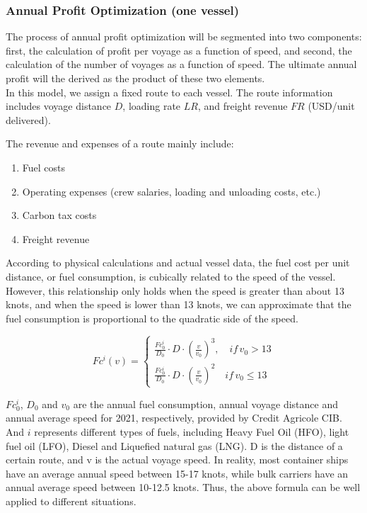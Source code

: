 \documentclass[a4paper,12pt]{article}
\begin{document}
\subsubsection*{Annual Profit Optimization (one vessel)}

The process of annual profit optimization will be segmented into two components: first, the calculation of profit per voyage as a function of speed, and second, the calculation of the number of voyages as a function of speed.
The ultimate annual profit will the derived as the product of these two elements.\\

In this model, we assign a fixed route to each vessel. The route information includes voyage distance $D$, loading rate $LR$, and freight revenue $FR$ (USD/unit delivered).

The revenue and expenses of a route mainly include:
\begin{enumerate}
	\item Fuel costs
	\item Operating expenses (crew salaries, loading and unloading costs, etc.)
	\item Carbon tax costs
	\item Freight revenue
\end{enumerate}

According to physical calculations and actual vessel data, the fuel cost per unit distance, or fuel consumption, is cubically related to the speed of the vessel.
However, this relationship only holds when the speed is greater than about 13 knots, and when the speed is lower than 13 knots, we can approximate that the fuel consumption is proportional to the quadratic side of the speed.

\begin{equation}
	\label{eq:fuel_consumption}
	Fc^i(v) =
	\left\{
	\begin{aligned}
		\frac{Fc^i_0}{D_0} \cdot D \cdot (\frac{v}{v_0})^3, \quad if \, v_0 > 13 \\
		\frac{Fc^i_0}{D_0} \cdot D \cdot (\frac{v}{v_0})^2 \quad if \, v_0 \leq 13
	\end{aligned}
	\right.
\end{equation}

$Fc^i_0$, $D_0$ and $v_0$ are the annual fuel consumption, annual voyage distance and annual average speed for 2021, respectively, provided by Credit Agricole CIB.
And $i$ represents different types of fuels, including Heavy Fuel Oil (HFO), light fuel oil (LFO), Diesel and Liquefied natural gas (LNG). D is the distance of a certain route, and v is the actual voyage speed.
In reality, most container ships have an average annual speed between 15-17 knots, while bulk carriers have an annual average speed between 10-12.5 knots.
Thus, the above formula can be well applied to different situations.\\
\end{document}
